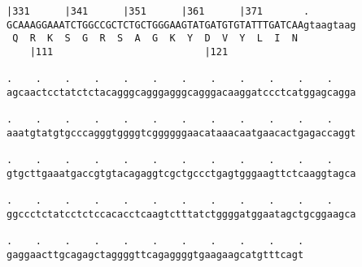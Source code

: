 \documentclass{article}
\begin{document}
\begin{Verbatim}[fontfamily=courier]
    |331      |341      |351      |361      |371       .    
GCAAAGGAAATCTGGCCGCTCTGCTGGGAAGTATGATGTGTATTTGATCAAgtaagtaag
 Q  R  K  S  G  R  S  A  G  K  Y  D  V  Y  L  I  N          
    |111                          |121                      

.    .    .    .    .    .    .    .    .    .    .    .    
agcaactcctatctctacagggcagggagggcagggacaaggatccctcatggagcagga

.    .    .    .    .    .    .    .    .    .    .    .    
aaatgtatgtgcccagggtggggtcggggggaacataaacaatgaacactgagaccaggt

.    .    .    .    .    .    .    .    .    .    .    .    
gtgcttgaaatgaccgtgtacagaggtcgctgccctgagtgggaagttctcaaggtagca

.    .    .    .    .    .    .    .    .    .    .    .    
ggccctctatcctctccacacctcaagtctttatctggggatggaatagctgcggaagca

.    .    .    .    .    .    .    .    .    .    .
gaggaacttgcagagctaggggttcagaggggtgaagaagcatgtttcagt
\end{Verbatim}
\newpage
\end{document}
